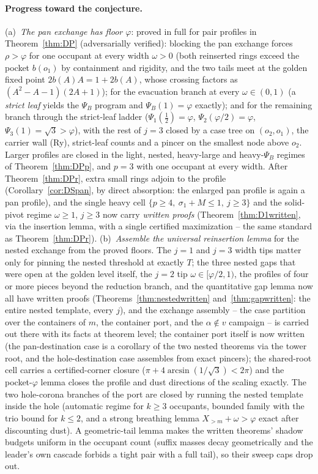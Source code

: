 \documentclass[11pt]{article}
\theoremstyle{definition}
\begin{document}
\paragraph{Progress toward the conjecture.} (a)~\emph{The pan
exchange has floor $\varphi$}: proved in full for pair profiles in
Theorem~\ref{thm:DP} (adversarially verified):
blocking the pan exchange forces
$\rho>\varphi$ for one occupant at every width $\omega>0$ (both
reinserted rings
exceed the pocket $b(o_1)$ by containment and rigidity, and the two
tails meet at the golden fixed point $2b(A)A=1+2b(A)$, whose crossing
factors as $(A^2-A-1)(2A+1)$); for the evacuation branch at every
$\omega\in(0,1)$
(a \emph{strict leaf} yields the $\Psi_B$ program and
$\Psi_B(1)=\varphi$ exactly); and for the remaining branch through the
strict-leaf ladder ($\Psi_1(\tfrac12)=\varphi$,
$\Psi_2(\varphi/2)=\varphi$, $\Psi_3(1)=\sqrt3>\varphi$), with the rest
of $j=3$ closed by a case tree on $(o_2,o_1)$, the carrier wall (Ry),
strict-leaf counts and a pincer on the smallest node above
$o_2$. Larger profiles are closed in the light,
nested, heavy-large and heavy-$\Psi_B$ regimes of
Theorem~\ref{thm:DPp}, and $p=3$ with one occupant at every width.
After Theorem~\ref{thm:DPr}, extra small rings adjoin to the profile
(Corollary~\ref{cor:DSpan}, by direct absorption: the enlarged pan
profile is again a pan profile), and the single heavy
cell $\{p\ge4,\ \sigma_1+M\le1,\ j\ge3\}$ and the solid-pivot regime
$\omega\ge1$, $j\ge3$ now carry \emph{written proofs}
(Theorem~\ref{thm:D1written}, via the insertion lemma, with a single
certified maximization -- the same standard as
Theorem~\ref{thm:DPr}).
(b)~\emph{Assemble the universal reinsertion lemma} for the nested
exchange from the proved floors. The $j=1$ and $j=3$ width tips
matter only for pinning the nested threshold at exactly $T$; the
three nested gaps that were open at the golden level itself, the
$j=2$ tip $\omega\in[\varphi/2,1)$, the profiles of four or more
pieces beyond the reduction branch, and the quantitative gap lemma
now all have written proofs (Theorems~\ref{thm:nestedwritten}
and~\ref{thm:gapwritten}: the entire nested template, every $j$),
and the
exchange assembly -- the case partition over the containers of $m$,
the container port, and the $\alpha\notin v$ campaign -- is carried
out there with its facts at theorem level; the container port itself
is now written (the pan-destination case is a corollary of the two
nested theorems via the tower root, and the hole-destination case
assembles from exact pincers); the shared-root cell
carries a certified-corner closure
($\pi+4\arcsin(1/\sqrt3)<2\pi$) and the pocket-$\varphi$ lemma
closes the profile and dust directions of the scaling exactly. The two
hole-corona branches of the port are closed by running the nested
template inside the hole (automatic regime for $k\ge3$ occupants,
bounded family with the trio bound for $k\le2$, and a strong
breathing lemma $X_{>m}+\omega>\varphi$ exact after discounting
dust). A geometric-tail lemma makes the written theorems'
shadow budgets uniform in the occupant count (suffix masses decay
geometrically and the leader's own cascade forbids a tight pair
with a full tail), so their sweep caps drop out.
\end{document}
